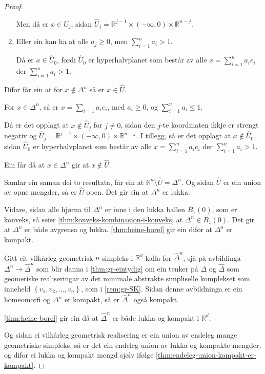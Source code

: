 \documentclass[a4paper, 12pt, norsk]{article}
\theoremstyle{plain}
\theoremstyle{definition}
\newcommand{\Rb}{\mathbb{R}}
\newcommand{\set}[1]{ \left\{ #1 \right\} } %
\begin{document}
\begin{proof}
\begin{enumerate}
{				Men då er \( x \in \hat{U}_j \), sidan \( \hat{U}_j = \Rb^{j-1}\times(-\infty, 0) \times \Rb^{n-j} \). }
  		\item { Eller ein kan ha at alle \( a_j \geq 0 \), men \( \sum_{i=1}^n a_i > 1 \). 
		
				 Då er \( x \in \hat{U}_0 \), fordi \( \hat{U}_0 \) er hyperhalvplanet som består av alle \( x = \sum_{i = 1}^n a_i e_i \) der \( \sum_{i = 1}^n a_i > 1 \).}
	\end{enumerate}

	Difor får ein at for \( x \not\in \Delta^n \) så er \( x \in \hat{U} \).

	For \( x \in \Delta^n \), så er \( x = \sum_{i=1} a_i e_i \), med \( a_i \geq 0 \), og \( \sum_{i=1}^n a_i \leq 1 \).

	Då er det opplagt at \( x \not\in \hat{U}_j \) for \( j \neq 0 \), sidan den \( j \)-te koordinaten ikkje er strengt negativ og \( \hat{U}_j = \Rb^{j-1}\times(-\infty, 0) \times \Rb^{n-j} \). I tillegg, så er det opplagt at \( x \not\in \hat{U}_0 \), sidan \( \hat{U}_0 \) er hyperhalvplanet som består av alle \( x = \sum_{i = 1}^n a_i e_i \) der \( \sum_{i = 1}^n a_i > 1 \).

	Ein får då at \( x \in \Delta^n \) gir at \( x \not\in \hat{U} \).

	Samlar ein saman dei to resultata, får ein at \( \Rb^n \setminus \hat{U} = \Delta^n \). Og sidan \( \hat{U} \) er ein union av opne mengder, så er \( \hat{U} \) open. Det gir ein at \( \Delta^n \) er lukka.

	Vidare, sidan alle hjørna til \( \Delta^n \) er inne i den lukka ballen \( \bar{B}_{1}(0) \), som er konveks, så seier \autoref{thm:konveks-kombinasjon-i-konveks} at \( \Delta^n \in \bar{B}_{1}(0) \). Det gir at \( \Delta^n \) er både avgrensa og lukka. \autoref{thm:heine-borel} gir ein difor at \( \Delta^n \) er kompakt.

	Gitt eit vilkårleg geometrisk \( n \)-simpleks i \( \Rb^d \) kalla for \( \hat{\Delta}^n \), sjå på avbildinga \( \Delta^n \to \hat{\Delta}^n \) som blir danna i \autoref{thm:gr-eintydig} om ein tenker på \( \Delta \) og \( \hat{\Delta} \) som geomeriske realiseringar av det minimale abstrakte simpliselle komplekset som inneheld \( \set{v_1, v_2, \dots, v_n} \), som i \autoref{rem:gr-SK}. Sidan denne avbildninga er ein homeomorfi og \( \Delta^n \) er kompakt, så er \( \hat{\Delta}^n \) også kompakt.

	\autoref{thm:heine-borel} gir ein då at \( \hat{\Delta}^n \) er både lukka og kompakt i \( \Rb^d \).

	Og sidan ei vilkårleg geometrisk realisering er ein union av endeleg mange geometriske simpleks, så er det ein endeleg union av lukka og kompakte mengder, og difor ei lukka og kompakt mengd sjølv ifølge \autoref{thm:endeleg-union-kompakt-er-kompakt}.
\end{proof}
\end{document}
